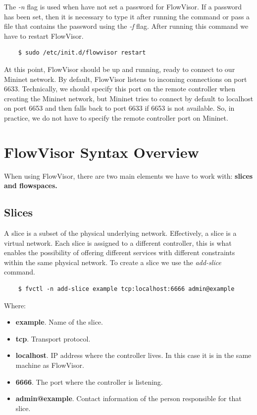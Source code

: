 The \textit{-n} flag is used when have not set a password for FlowVisor. If a password has been set, then it is necessary to type it after running the command or pass a file that contains the password using the \textit{-f} flag. After running this command we have to restart FlowVisor. 
\begin{lstlisting}
    $ sudo /etc/init.d/flowvisor restart
\end{lstlisting}

At this point, FlowVisor should be up and running, ready to connect to our Mininet network. By default, FlowVisor listens to incoming connections on port 6633. Technically, we should specify this port on the remote controller when creating the Mininet network, but Mininet tries to connect by default to localhost on port 6653 and then falls back to port 6633 if 6653 is not available. So, in practice, we do not have to specify the remote controller port on Mininet. 

\section{FlowVisor Syntax Overview}
When using FlowVisor, there are two main elements we have to work with: \textbf{slices and flowspaces.}

\subsection{Slices}
A slice is a subset of the physical underlying network. Effectively, a slice is a virtual network. Each slice is assigned to a different controller, this is what enables the possibility of offering different services with different constraints within the same physical network. To create a slice we use the \textit{add-slice} command.
\begin{lstlisting}
    $ fvctl -n add-slice example tcp:localhost:6666 admin@example
\end{lstlisting}

Where:
\begin{itemize}
    \item \textbf{example}. Name of the slice.
    \item \textbf{tcp}. Transport protocol.
    \item \textbf{localhost}. IP address where the controller lives. In this case it is in the same machine as FlowVisor.
    \item \textbf{6666}. The port where the controller is listening.
    \item \textbf{admin@example}. Contact information of the person responsible for that slice.
\end{itemize}

